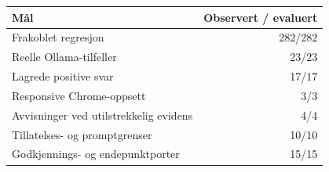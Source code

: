 \begin{tabular}{lr}
\toprule
Mål & Observert / evaluert \\
\midrule
Frakoblet regresjon & 282/282 \\
Reelle Ollama-tilfeller & 23/23 \\
Lagrede positive svar & 17/17 \\
Responsive Chrome-oppsett & 3/3 \\
Avvisninger ved utilstrekkelig evidens & 4/4 \\
Tillatelses- og promptgrenser & 10/10 \\
Godkjennings- og endepunktporter & 15/15 \\
\bottomrule
\end{tabular}

